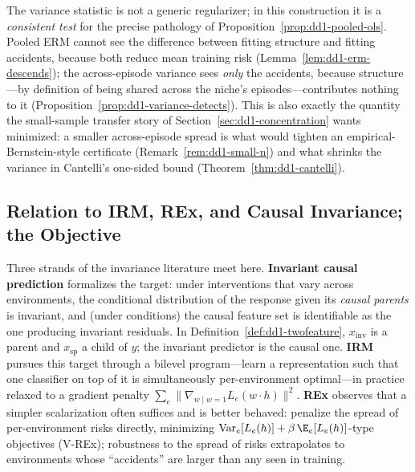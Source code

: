 \begin{keypoint}
The variance statistic is not a generic regularizer; in this construction it
is a \emph{consistent test} for the precise pathology of
Proposition~\ref{prop:dd1-pooled-ols}. Pooled ERM cannot see the difference
between fitting structure and fitting accidents, because both reduce mean
training risk (Lemma~\ref{lem:dd1-erm-descends}); the across-episode variance
sees \emph{only} the accidents, because structure---by definition of being
shared across the niche's episodes---contributes nothing to it
(Proposition~\ref{prop:dd1-variance-detects}). This is also exactly the
quantity the small-sample transfer story of
Section~\ref{sec:dd1-concentration} wants minimized: a smaller
across-episode spread is what would tighten an empirical-Bernstein-style
certificate (Remark~\ref{rem:dd1-small-n}) and what shrinks the variance in
Cantelli's one-sided bound (Theorem~\ref{thm:dd1-cantelli}).
\end{keypoint}

\subsection{Relation to IRM, REx, and Causal Invariance; the \nm{} Objective}

Three strands of the invariance literature meet here.
\textbf{Invariant causal prediction} \cite{peters2016causal} formalizes the
target: under interventions that vary across environments, the conditional
distribution of the response given its \emph{causal parents} is invariant,
and (under conditions) the causal feature set is identifiable as the one
producing invariant residuals. In Definition~\ref{def:dd1-twofeature},
$x_{\mathrm{inv}}$ is a parent and $x_{\mathrm{sp}}$ a child of $y$; the
invariant predictor is the causal one.
\textbf{IRM} \cite{arjovsky2019irm} pursues this target through a bilevel
program---learn a representation such that one classifier on top of it is
simultaneously per-environment optimal---in practice relaxed to a gradient
penalty $\sum_e \|\nabla_{w \mid w = 1} L_e(w \cdot h)\|^2$.
\textbf{REx} \cite{krueger2021rex} observes that a simpler scalarization
often suffices and is better behaved: penalize the spread of per-environment
risks directly, minimizing
$\mathrm{Var}_e[L_e(h)] + \beta\, \E_e[L_e(h)]$-type objectives (V-REx);
robustness to the spread of risks extrapolates to environments whose
``accidents'' are larger than any seen in training.

